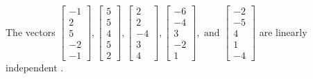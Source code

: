 \begin{exercise}
\begin{exerciseStatement}
  \end{exerciseStatement}
  \begin{exerciseAnswer}
   The vectors \(\left[\begin{array}{r}
-1 \\
2 \\
5 \\
-2 \\
-1
\end{array}\right] , \left[\begin{array}{r}
5 \\
5 \\
4 \\
5 \\
2
\end{array}\right] , \left[\begin{array}{r}
2 \\
2 \\
-4 \\
3 \\
4
\end{array}\right] , \left[\begin{array}{r}
-6 \\
-4 \\
3 \\
-2 \\
1
\end{array}\right] , \text{ and } \left[\begin{array}{r}
-2 \\
-5 \\
4 \\
1 \\
-4
\end{array}\right]\) are 
  	 linearly independent  .
  


  \end{exerciseAnswer}
\end{exercise}